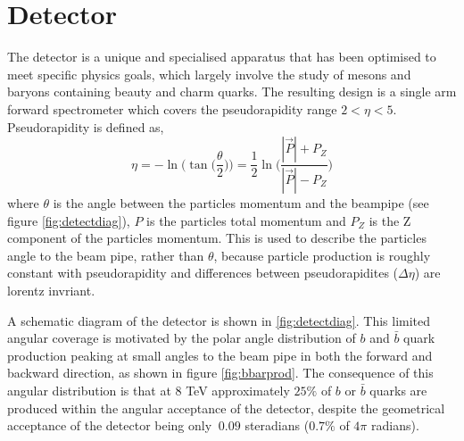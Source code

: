 
\section{Detector}
\label{sec:Detector}

The \lhcb detector is a unique and specialised apparatus that has been optimised to meet specific physics goals, which largely involve the study of mesons and baryons containing beauty and charm quarks.  The resulting design is a single arm forward spectrometer which covers the pseudorapidity range $2 < \eta < 5$.  Pseudorapidity is defined as,
\begin{equation}
   \eta = -\ln \bigg(\tan\big(\frac{\theta}{2}\big)\bigg)=\frac{1}{2}\ln\bigg(\frac{|\vec{P}|+P_Z}{|\vec{P}|-P_Z}\bigg)
\end{equation}
 where $\theta$ is the angle between the particles momentum and the beampipe (see figure \ref{fig:detectdiag}), $P$ is the particles total momentum and $P_Z$ is the Z component of the particles momentum.  This is used to describe the particles angle to the beam pipe, rather than $\theta$, because particle production is roughly constant with pseudorapidity and differences between pseudorapidites ($\Delta \eta$) are lorentz invriant.

A schematic diagram of the detector is shown in \ref{fig:detectdiag}.  This limited angular coverage is motivated by the polar angle distribution of  $b$ and $\bar{b}$ quark production peaking at small angles to the beam pipe in both the forward and backward direction, as shown in figure \ref{fig:bbarprod}.  The consequence of this angular distribution is that at 8 TeV approximately $25\%$ of $b$ or $\bar{b}$ quarks are produced within the angular acceptance of the \lhcb detector, despite the geometrical acceptance of the detector being only $~0.09$ steradians ($0.7\%$ of $4\pi$ radians).

